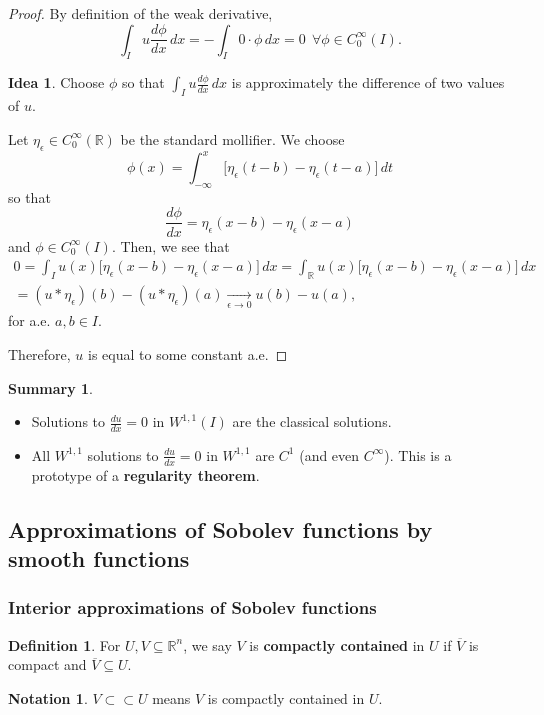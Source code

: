 \documentclass[12pt]{article}
\theoremstyle{definition}
\newtheorem*{definition*}{Definition}
\newtheorem*{notation}{Notation}
\newtheorem*{summary}{Summary}
\newtheorem*{idea}{Idea}
\begin{document}
\begin{proof}
By definition of the weak derivative,
\[\int_Iu\frac{d\phi}{dx}\,dx=-\int_I0\cdot\phi\,dx=0\ \ \forall\phi\in C_0^\infty(I).\]

\begin{idea}
Choose $\phi$ so that $\int_Iu\frac{d\phi}{dx}\,dx$ is approximately the difference of two values of $u$.
\end{idea}

Let $\eta_\epsilon\in C_0^\infty(\mathbb R)$ be the standard mollifier. We choose
\[\phi(x)=\int_{-\infty}^x\big[\eta_\epsilon(t-b)-\eta_\epsilon(t-a)\big]\,dt\]
so that
\[\frac{d\phi}{dx}=\eta_\epsilon(x-b)-\eta_\epsilon(x-a)\]
and $\phi\in C_0^\infty(I)$. Then, we see that
\begin{multline*}
0=\int_Iu(x)\big[\eta_\epsilon(x-b)-\eta_\epsilon(x-a)\big]\,dx=\int_\mathbb Ru(x)\big[\eta_\epsilon(x-b)-\eta_\epsilon(x-a)\big]\,dx\\
=(u*\eta_\epsilon)(b)-(u*\eta_\epsilon)(a)\xrightarrow[\epsilon\to0]{}u(b)-u(a),
\end{multline*}
for a.e. $a,b\in I$.

Therefore, $u$ is equal to some constant a.e.
\end{proof}

\begin{summary}
\begin{itemize}[label=$-$]
\item Solutions to $\frac{du}{dx}=0$ in $W^{1,1}(I)$ are the classical solutions.

\item All $W^{1,1}$ solutions to $\frac{du}{dx}=0$ in $W^{1,1}$ are $C^1$ (and even $C^\infty$). This is a prototype of a \textbf{regularity theorem}.
\end{itemize}
\end{summary}

\subsection{Approximations of Sobolev functions by smooth functions}
\subsubsection{Interior approximations of Sobolev functions}

\begin{definition*}
For $U,V\subseteq\mathbb R^n$, we say $V$ is \textbf{compactly contained} in $U$ if $\overline V$ is compact and $\overline V\subseteq U$.
\end{definition*}
\begin{notation}
$V\subset\subset U$ means $V$ is compactly contained in $U$.
\end{notation}
\end{document}
